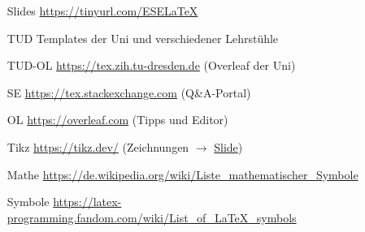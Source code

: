 \begin{frame}
\hspace{2em}
\begin{minipage}{.9\textwidth}
\begin{itemize}[<+->]
	\item[Slides] \url{https://tinyurl.com/ESELaTeX}
	\item[TUD] Templates der Uni und verschiedener Lehrstühle
	\item[TUD-OL] \url{https://tex.zih.tu-dresden.de} (Overleaf der Uni)
	\item[SE] \url{https://tex.stackexchange.com} (Q\&A-Portal)
	\item[OL] \url{https://overleaf.com} (Tipps und Editor)
	\item[Tikz] \url{https://tikz.dev/}
		(Zeichnungen $\to$ \hyperlink{tikz-final}{Slide})
	\item[Mathe] \url{https://de.wikipedia.org/wiki/Liste_mathematischer_Symbole}
	\item[Symbole] \url{https://latex-programming.fandom.com/wiki/List_of_LaTeX_symbols}
\end{itemize}
\end{minipage}
\end{frame}
